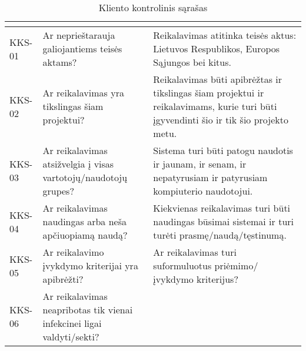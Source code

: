 \documentclass{VUMIFPSkursinis}
\begin{document}
\begin{center}

	\begin{longtable}{|C{2cm}|L{5cm}|L{8cm}|}

		\caption{Kliento kontrolinis sąrašas}
		\label{table:KKS}

		\\ \hline
		                                               &
		                                   &
		\\ \hline
		KKS-01                                                                                        &
		Ar neprieštarauja galiojantiems teisės aktams?                          					  &
		Reikalavimas atitinka teisės aktus: Lietuvos Respublikos, Europos Sąjungos bei kitus.                                     
		\\ \hline
		KKS-02                                                                                        &
		Ar reikalavimas yra tikslingas šiam projektui? 												  &
		Reikalavimas būti apibrėžtas ir tikslingas šiam projektui ir reikalavimams, kurie turi būti įgyvendinti šio ir tik šio projekto metu.                                                                      
		\\ \hline
		KKS-03                                                                                        &
		Ar reikalavimas atsižvelgia į visas vartotojų/naudotojų grupes?                               &
		Sistema turi būti patogu naudotis ir jaunam, ir senam, ir nepatyrusiam ir patyrusiam kompiuterio naudotojui.
		\\ \hline
		KKS-04                                                                                        &
		Ar reikalavimas naudingas arba neša apčiuopiamą naudą?  									  &
		Kiekvienas reikalavimas turi būti naudingas būsimai sistemai ir turi turėti prasmę/naudą/tęstinumą. 
		\\ \hline 
		KKS-05                                                                                        &
		Ar reikalavimo įvykdymo kriterijai yra apibrėžti?                                             &
		Ar reikalavimas turi suformuluotus priėmimo/įvykdymo kriterijus? 
		\\ \hline
		KKS-06                                                                                        &
		Ar reikalavimas neapribotas tik vienai infekcinei ligai valdyti/sekti?                        &

\end{longtable}
\end{center}
\end{document}
